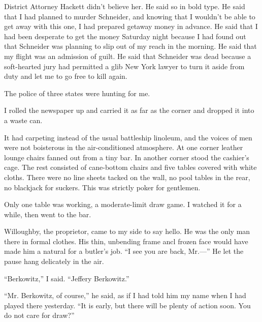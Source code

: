 \documentclass{novel}
\begin{document}
District Attorney Hackett didn’t believe her. He said so in bold type. He said that I had planned to murder Schneider, and knowing that I wouldn’t be able to get away with this one, I had prepared getaway money in advance. He said that I had been desperate to get the money Saturday night because I had found out that Schneider was planning to slip out of my reach in the morning. He said that my flight was an admission of guilt. He said that Schneider was dead because a soft-hearted jury had permitted a glib New York lawyer to turn it aside from duty and let me to go free to kill again.

The police of three states were hunting for me.

I rolled the newspaper up and carried it as far as the corner and dropped it into a waste can.

\vspace{2\nbs}
\clearpage
\thispagestyle{empty}


\begin{ChapterStart}
\vspace{3\nbs}
\end{ChapterStart}

It had carpeting instead of the usual battleship linoleum, and the voices of men were not boisterous in the air-conditioned atmosphere. At one corner leather lounge chairs fanned out from a tiny bar. In another corner stood the cashier’s cage. The rest consisted of cane-bottom chairs and five tables covered with white cloths. There were no line sheets tacked on the wall, no pool tables in the rear, no blackjack for suckers. This was strictly poker for gentlemen.

Only one table was working, a moderate-limit draw game. I watched it for a while, then went to the bar.

Willoughby, the proprietor, came to my side to say hello. He was the only man there in formal clothes. His thin, unbending frame ancl frozen face would have made him a natural for a butler’s job. “I see you are back, Mr.—” He let the pause hang delicately in the air.

“Berkowitz,” I said. “Jeffery Berkowitz.”

“Mr. Berkowitz, of course,” he said, as if I had told him my name when I had played there yesterday. “It is early, but there will be plenty of action soon. You do not care for draw?”
\end{document}
